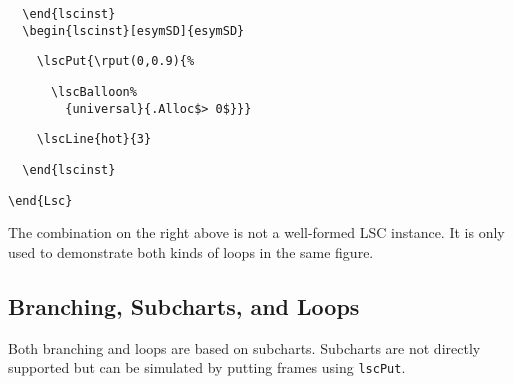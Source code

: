 \documentclass{article}
\newcommand{\bs}{\usebox{\bsbox}}
\newcommand{\cmd}[1]{\bs\texttt{#1}}
\newcommand{\mlscPut}{\cmd{lscPut}}
\begin{document}
\begin{center}
\begin{minipage}{0.5\textwidth}
\verbunskip%
\begin{verbatim}
  \end{lscinst}
  \begin{lscinst}[esymSD]{esymSD}
\end{verbatim}%
\verbunskip%
{\gray\begin{verbatim}
    \lscPut{\rput(0,0.9){%
\end{verbatim}}%
\verbunskip%
{\begin{verbatim}
      \lscBalloon%
        {universal}{.Alloc$> 0$}}}
\end{verbatim}}%
\verbunskip%
{\gray\begin{verbatim}
    \lscLine{hot}{3}
\end{verbatim}}%
\verbunskip%
\begin{verbatim}
  \end{lscinst}
\end{verbatim}%
\verbunskip%
{\gray%
\begin{verbatim}
\end{Lsc}
\end{verbatim}}
\end{minipage}
\end{center}%>@>

The combination on the right above is not a well-formed LSC instance.  It is
only used to demonstrate both kinds of loops in the same figure.

\subsection{Branching, Subcharts, and Loops}
\label{sec:pipo:scopes}

Both 
branching and 
loops are based on 
subcharts.
%
Subcharts are not directly supported but can be simulated by putting frames
using \mlscPut{}.
\end{document}
